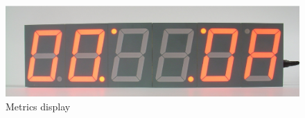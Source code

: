 \documentclass{article}
\begin{document}
\begin{figure}
\centering
\includegraphics[width=4.75in]{figures/metrics.eps}
\caption{Metrics display}
\label{fig:metrics}
\end{figure}
\end{document}
